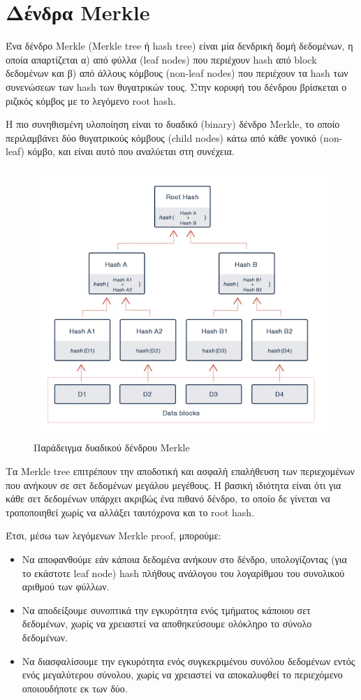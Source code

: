 \section{Δένδρα Merkle} \label{section:2-3-merkle-trees}

Ένα δένδρο Merkle (Merkle tree ή hash tree) είναι μία δενδρική δομή δεδομένων, η οποία απαρτίζεται α) από φύλλα (leaf nodes) που περιέχουν hash από block δεδομένων και β) από άλλους κόμβους (non-leaf nodes) που περιέχουν τα hash των συνενώσεων των hash των θυγατρικών τους. Στην κορυφή του δένδρου βρίσκεται ο ριζικός κόμβος με το λεγόμενο root hash.

Η πιο συνηθισμένη υλοποίηση είναι το δυαδικό (binary) δένδρο Merkle, το οποίο περιλαμβάνει δύο θυγατρικούς κόμβους (child nodes) κάτω από κάθε γονικό (non-leaf) κόμβο, και είναι αυτό που αναλύεται στη συνέχεια.

\begin{figure}[H]
	\centering
	\includegraphics[width=.85\textwidth]{assets/figures/chapter-2/2.3.merkle-tree.png}
	\caption{Παράδειγμα δυαδικού δένδρου Merkle}
\end{figure}

Τα Merkle tree επιτρέπουν την αποδοτική και ασφαλή επαλήθευση των περιεχομένων που ανήκουν σε σετ δεδομένων μεγάλου μεγέθους. Η βασική ιδιότητα είναι ότι για κάθε σετ δεδομένων υπάρχει ακριβώς ένα πιθανό δένδρο, το οποίο δε γίνεται να τροποποιηθεί χωρίς να αλλάξει ταυτόχρονα και το root hash. 

Έτσι, μέσω των λεγόμενων Merkle proof, μπορούμε:
\begin{itemize}
	\item Να αποφανθούμε εάν κάποια δεδομένα ανήκουν στο δένδρο, υπολογίζοντας (για το εκάστοτε leaf node) hash πλήθους ανάλογου του λογαρίθμου του συνολικού αριθμού των φύλλων.
	\item Να αποδείξουμε συνοπτικά την εγκυρότητα ενός τμήματος κάποιου σετ δεδομένων, χωρίς να χρειαστεί να αποθηκεύσουμε ολόκληρο το σύνολο δεδομένων.
	\item Να διασφαλίσουμε την εγκυρότητα ενός συγκεκριμένου συνόλου δεδομένων εντός ενός μεγαλύτερου σύνολου, χωρίς να χρειαστεί να αποκαλυφθεί το περιεχόμενο οποιουδήποτε εκ των δύο.\cite{2.3-merkle-proofs-explained} 
\end{itemize}
